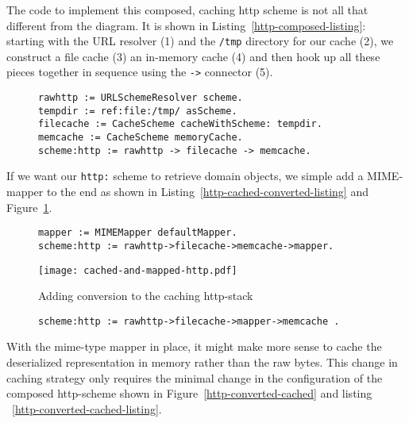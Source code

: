 \documentclass[preprint,authoryear]{llncs}
\begin{document}
The code to implement this composed, caching http scheme is not all 
that different from the diagram.  It is shown in Listing~\ref{http-composed-listing}:  
starting with the URL resolver (1) and the {\tt /tmp} directory for our cache (2), we construct
a file cache (3) an in-memory cache (4) and then hook up all these pieces together
in sequence using the {\tt ->} connector (5).

\begin{figure}[htbp]
\begin{lstlisting}[style=numbers,label=http-composed-listing,caption=Code for caching http stack.]
rawhttp := URLSchemeResolver scheme.
tempdir := ref:file:/tmp/ asScheme.
filecache := CacheScheme cacheWithScheme: tempdir.
memcache := CacheScheme memoryCache.
scheme:http := rawhttp -> filecache -> memcache.
\end{lstlisting}
\end{figure}

If we want our {\tt http:} scheme to retrieve domain objects, we simple add a MIME-mapper
to the end as shown in Listing~\ref{http-cached-converted-listing} and Figure~\ref{http-cached-converted}.


\begin{figure}[htbp]
\begin{lstlisting}[style=L,label=http-cached-converted-listing,caption=Caching and converting.]
mapper := MIMEMapper defaultMapper.
scheme:http := rawhttp->filecache->memcache->mapper.
\end{lstlisting}
\end{figure}


\begin{figure}[htbp]
\begin{center}
\texttt{[image: cached-and-mapped-http.pdf]}
\caption{Adding conversion to the caching http-stack}
\label{http-cached-converted}
\end{center}
\end{figure}


\begin{figure}[htbp]
\begin{lstlisting}[style=L,label=http-converted-cached-listing,caption=Converting and caching.]
scheme:http := rawhttp->filecache->mapper->memcache .
\end{lstlisting}
\end{figure}


With the mime-type mapper in place, it might make more sense to
cache the deserialized representation in memory rather than
the raw bytes.  This change in caching strategy only requires
the minimal change in the configuration of the composed http-scheme
shown in Figure~\ref{http-converted-cached} and listing ~\ref{http-converted-cached-listing}.
\end{document}
